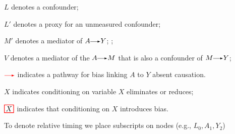 {\begin{tabular}
{$L$ denotes a confounder;

$L'$ denotes a proxy for an unmeasured confounder;

$M'$ denotes a mediator of $A\rightarrowNEW Y$; ;

$V$ denotes a mediator of the $A\rightarrowNEW M$ that is also a confounder of $M\rightarrowNEW Y$;

$\rightarrowred$ indicates a pathway for bias linking $A$ to $Y$ absent causation.

$\boxed{X}$ indicates conditioning on variable $X$ eliminates or reduces;

$\boxedred{X}$ indicates that conditioning on $X$ introduces bias.

To denote relative timing we place subscripts on nodes (e.g., $L_0, A_1, Y_2$)}
\end{tabular}
}
